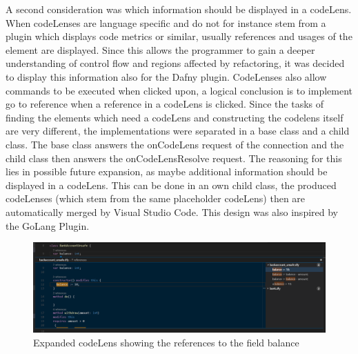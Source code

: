 A second consideration was which information should be displayed in a codeLens. When codeLenses are language specific and do not for instance stem from a plugin which displays code metrics or similar, usually references and usages of the element are displayed. Since this allows the programmer to gain a deeper understanding of control flow and regions affected by refactoring, it was decided to display this information also for the Dafny plugin. CodeLenses also allow commands to be executed when clicked upon, a logical conclusion is to implement go to reference when a reference in a codeLens is clicked.\newline
Since the tasks of finding the elements which need a codeLens and constructing the codelens itself are very different, the implementations were separated in a base class and a child class. The base class answers the onCodeLens request of the connection and the child class then answers the onCodeLensResolve request. The reasoning for this lies in possible future expansion, as maybe additional information should be displayed in a codeLens. This can be done in an own child class, the produced codeLenses (which stem from the same placeholder codeLens) then are automatically merged by Visual Studio Code. This design was also inspired by the GoLang Plugin. 

\begin{figure}[H]
	\centering
	\includegraphics[width=1\textwidth]{img/codelensesExpanded}
	\caption{Expanded codeLens showing the references to the field balance}
	\label{fig:codelensesexpanded}
\end{figure}

